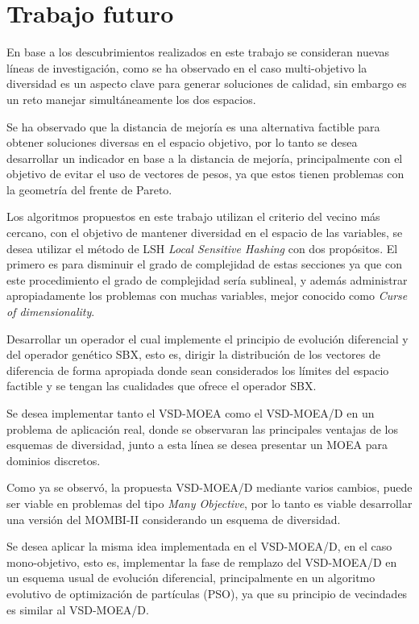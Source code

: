 \section{Trabajo futuro}

En base a los descubrimientos realizados en este trabajo se consideran nuevas líneas de investigación, como se ha observado en el caso multi-objetivo la diversidad es un aspecto clave para generar soluciones de calidad, sin embargo es un reto manejar simultáneamente los dos espacios.
%

Se ha observado que la distancia de mejoría es una alternativa factible para obtener soluciones diversas en el espacio objetivo, por lo tanto se desea desarrollar un indicador en base a la distancia de mejoría, principalmente con el objetivo de evitar el uso de vectores de pesos, ya que estos tienen problemas con la geometría del frente de Pareto.

Los algoritmos propuestos en este trabajo utilizan el criterio del vecino más cercano, con el objetivo de mantener diversidad en el espacio de las variables, se desea utilizar el método de LSH \textit{Local Sensitive Hashing} con dos propósitos. El primero es para disminuir el grado de complejidad de estas secciones ya que con este procedimiento el grado de complejidad sería sublineal, y además administrar apropiadamente los problemas con muchas variables, mejor conocido como \textit{Curse of dimensionality}.

Desarrollar un operador el cual implemente el principio de evolución diferencial y del operador genético SBX, esto es, dirigir la distribución de los vectores de diferencia de forma apropiada donde sean considerados los límites del espacio factible y se tengan las cualidades que ofrece el operador SBX.


Se desea implementar tanto el VSD-MOEA como el VSD-MOEA/D en un problema de aplicación real, donde se observaran las principales ventajas de los esquemas de diversidad, junto a esta línea se desea presentar un MOEA para dominios discretos.

Como ya se observó, la propuesta VSD-MOEA/D mediante varios cambios, puede ser viable en problemas del tipo \textit{Many Objective}, por lo tanto es viable desarrollar una versión del MOMBI-II considerando un esquema de diversidad.

Se desea aplicar la misma idea implementada en el VSD-MOEA/D, en el caso mono-objetivo, esto es, implementar la fase de remplazo del VSD-MOEA/D en un esquema usual de evolución diferencial, principalmente en un algoritmo evolutivo de optimización de partículas (PSO), ya que su principio de vecindades es similar al VSD-MOEA/D.




